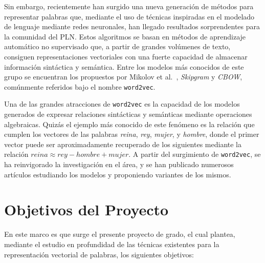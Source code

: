Sin embargo, recientemente han surgido una nueva generación de métodos para representar palabras
que, mediante el uso de técnicas inspiradas en el modelado de lenguaje mediante redes neuronales,
han llegado resultados sorprendentes para la comunidad del PLN\@. Estos algoritmos se basan en métodos
de aprendizaje automático no supervisado que, a partir de grandes volúmenes de texto, consiguen
representaciones vectoriales con una fuerte capacidad de almacenar información sintáctica y
semántica. Entre los modelos más conocidos de este grupo se encuentran los propuestos por Mikolov et
al.~\cite{Mikolov2013a, Mikolov2013b, Mikolov2013c}, \textit{Skipgram} y \textit{CBOW}, comúnmente
referidos bajo el nombre \texttt{word2vec}.

Una de las grandes atracciones de \texttt{word2vec} es la capacidad de los modelos generados de
expresar relaciones sintácticas y semánticas mediante operaciones algebraicas. Quizás el ejemplo más
conocido de este fenómeno es la relación que cumplen los vectores de las palabras \textit{reina},
\textit{rey}, \textit{mujer}, y \textit{hombre}, donde el primer vector puede ser aproximadamente
recuperado de los siguientes mediante la relación $reina \approx rey - hombre + mujer$. A partir del
surgimiento de \texttt{word2vec}, se ha reinvigorado la investigación en el área, y se han publicado
numerosos artículos estudiando los modelos y proponiendo variantes de los mismos.


\section{Objetivos del Proyecto}

En este marco es que surge el presente proyecto de grado, el cual plantea, mediante el estudio en
profundidad de las técnicas existentes para la representación vectorial de palabras, los siguientes
objetivos:

